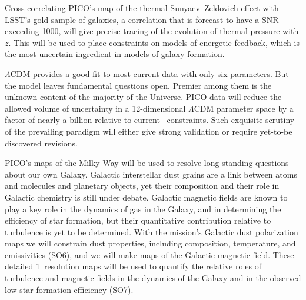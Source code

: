 \documentclass[PICOReport.tex]{subfiles}
\begin{document}
Cross-correlating PICO's map of the thermal Sunyaev--Zeldovich effect with LSST's gold sample of galaxies, a correlation that is forecast to have a \ac{SNR} exceeding 1000, will give precise tracing of the evolution of thermal pressure with $z$. This will be used to place constraints on models of energetic feedback, which is the most uncertain ingredient in models of galaxy formation. 


$\Lambda$CDM provides a good fit to most current data with only six parameters. But the model leaves fundamental questions open. Premier among them is the unknown content of the majority of the Universe. PICO data will reduce the allowed volume of uncertainty in a 12-dimensional $ \Lambda$CDM parameter space by a factor of nearly a billion relative to current \planck\ constraints. Such exquisite scrutiny of the prevailing paradigm will either give strong validation or require yet-to-be discovered revisions.

PICO's maps of the Milky Way will be used to resolve long-standing questions about our own Galaxy. Galactic interstellar dust grains are a link between atoms and molecules and planetary objects, yet their composition and their role in Galactic chemistry is still under debate. Galactic magnetic fields are known to play a key role in the dynamics of gas in the Galaxy, and in determining the efficiency of star formation, but their quantitative contribution relative to turbulence is yet to be determined. With the mission's Galactic dust polarization maps we will constrain dust properties, including composition, temperature, and emissivities (SO6), and we will make maps of the Galactic magnetic field. These detailed 1\arcmin\ resolution maps will be used to quantify the relative roles of turbulence and magnetic fields in the dynamics of the Galaxy and in the observed low star-formation efficiency (SO7). 
\end{document}
